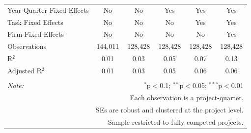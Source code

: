 \documentclass[
]{article}
\begin{document}
\begin{table}[H]
\begin{tabular}{@{\extracolsep{-2pt}}lccccc}
Year-Quarter Fixed Effects & No & No & Yes & Yes & Yes \\ 
Task Fixed Effects & No & No & No & Yes & Yes \\ 
Firm Fixed Effects & No & No & No & No & Yes \\ 
Observations & 144,011 & 128,428 & 128,428 & 128,428 & 128,428 \\ 
R$^{2}$ & 0.01 & 0.03 & 0.05 & 0.07 & 0.13 \\ 
Adjusted R$^{2}$ & 0.01 & 0.03 & 0.05 & 0.06 & 0.06 \\ 
\hline 
\hline \\[-1.8ex] 
\textit{Note:}  & \multicolumn{5}{r}{$^{*}$p$<$0.1; $^{**}$p$<$0.05; $^{***}$p$<$0.01} \\ 
 & \multicolumn{5}{r}{Each observation is a project-quarter.} \\ 
 & \multicolumn{5}{r}{SEs are robust and clustered at the project level.} \\ 
 & \multicolumn{5}{r}{Sample restricted to fully competed projects.} \\ 
\end{tabular} 
\end{table}
\end{document}
